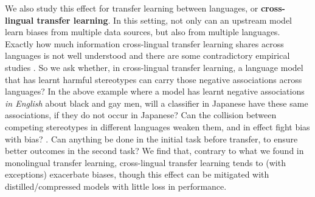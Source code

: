 We also study this effect for transfer learning between languages, or \textbf{cross-lingual transfer learning}. In this setting, not only can an upstream model learn biases from multiple data sources, but also from multiple languages. Exactly how much information cross-lingual transfer learning shares across languages is not well understood and there are some contradictory empirical studies \cite{}. So we ask whether, in cross-lingual transfer learning, a language model that has learnt harmful stereotypes can carry those negative associations across languages? In the above example where a model has learnt negative associations \textit{in English} about black and gay men, will a classifier in Japanese have these same associations, if they do not occur in Japanese? Can the collision between competing stereotypes in different languages weaken them, and in effect fight bias with bias? \citep{stanovsky-etal-2019-evaluating}. Can anything be done in the initial task before transfer, to ensure better outcomes in the second task? We find that, contrary to what we found in monolingual transfer learning, cross-lingual transfer learning tends to (with exceptions) exacerbate biases, though this effect can be mitigated with distilled/compressed models with little loss in performance. 

